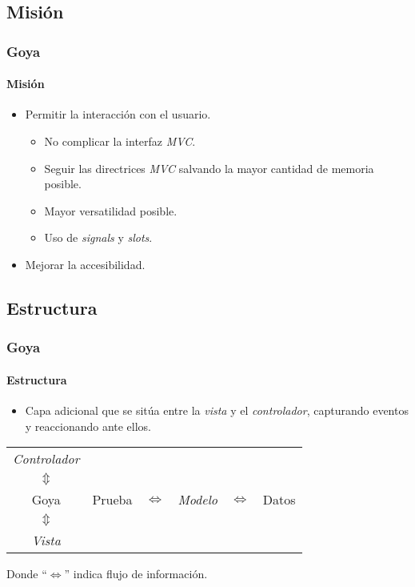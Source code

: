 \documentclass[12pt]{beamer}
\begin{document}
\subsection{Misión}
\begin{frame}
  \frametitle{Goya}
  \framesubtitle{Misión}

  \begin{block}{}
    \begin{itemize}
      \item Permitir la interacción con el usuario.
      \begin{itemize}
        \item No complicar la interfaz \emph{MVC}.
        \medskip
        \pause
        \item Seguir las directrices \emph{MVC} salvando la mayor cantidad de memoria posible.
        \medskip
        \pause
        \item Mayor versatilidad posible.
        \medskip
        \pause
        \item Uso de \emph{signals} y \emph{slots}.
      \end{itemize}
      \medskip
      \pause
      \item Mejorar la accesibilidad.
    \end{itemize}
  \end{block}

\end{frame}

\subsection{Estructura}
\begin{frame}
  \frametitle{Goya}
  \framesubtitle{Estructura}

  \begin{block}{}
    \begin{itemize}
      \item Capa adicional que se sitúa entre la \emph{vista} y el \emph{controlador}, capturando eventos y reaccionando ante ellos.
    \end{itemize}
    \medskip
    \pause
    \begin{center}
      \begin{tabular}{cccccc}
        \emph{Controlador} & \multirow{5}{*}{Prueba} \\
        \textcolor{oxygenorange}{$\Updownarrow$} \\
        Goya & & \textcolor{oxygenorange}{$\Leftrightarrow$} & \emph{Modelo} & \textcolor{oxygenorange}{$\Leftrightarrow$} & Datos\\
        \textcolor{oxygenorange}{$\Updownarrow$} \\
        \emph{Vista}
      \end{tabular}
    \end{center}
    \begin{tiny}\begin{center}Donde ``\textcolor{oxygenorange}{$\Leftrightarrow$}'' indica flujo de información.\end{center}\end{tiny}
  \end{block}
\end{frame}
\end{document}
